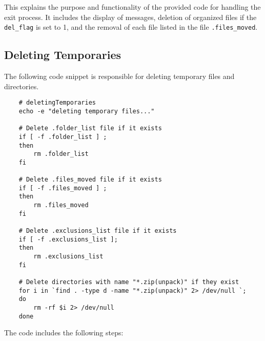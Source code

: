 \documentclass[12pt]{article}
\begin{document}
    This explains the purpose and functionality of the provided code for handling the exit process. It includes the display of messages, deletion of organized files if the \texttt{del\_flag} is set to 1, and the removal of each file listed in the file \texttt{.files\_moved}.


    \subsection{Deleting Temporaries}

    The following code snippet is responsible for deleting temporary files and directories.
    
    \begin{verbatim}
    # deletingTemporaries
    echo -e "deleting temporary files..."
    
    # Delete .folder_list file if it exists
    if [ -f .folder_list ] ;
    then
        rm .folder_list
    fi
    
    # Delete .files_moved file if it exists
    if [ -f .files_moved ] ;
    then
        rm .files_moved
    fi
    
    # Delete .exclusions_list file if it exists
    if [ -f .exclusions_list ];
    then
        rm .exclusions_list
    fi
    
    # Delete directories with name "*.zip(unpack)" if they exist
    for i in `find . -type d -name "*.zip(unpack)" 2> /dev/null `;
    do
        rm -rf $i 2> /dev/null
    done
    \end{verbatim}
    
    The code includes the following steps:
    
\end{document}
